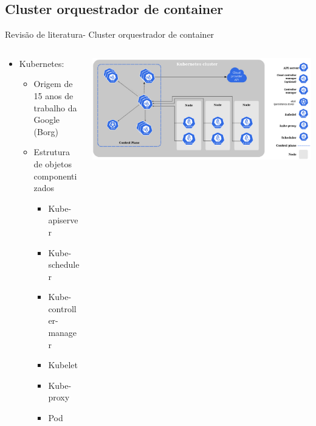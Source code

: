 \documentclass[10pt,brazil]{beamer}
\theoremstyle{definition}
\begin{document}
\subsection{Cluster orquestrador de container}

\begin{frame}{Revisão de literatura- Cluster orquestrador de container}
  \begin{columns}
    \begin{column}{0.5\textwidth}
      \begin{itemize}
        \item Kubernetes\textregistered:
              \begin{itemize}
                \item Origem de 15 anos de trabalho da Google (Borg) %
                \item Estrutura de objetos componentizados %
                      \begin{itemize}
                        \item Kube-apiserver
                        \item Kube-scheduler
                        \item Kube-controller-manager
                        \item Kubelet
                        \item Kube-proxy
                        \item Pod
                      \end{itemize}
              \end{itemize}
      \end{itemize}
    \end{column}
    \begin{column}{0.5\textwidth}  %
      \begin{center}
        \includegraphics[width=1\textwidth]{kubeadm-node.png}
      \end{center}
    \end{column}
  \end{columns}
\end{frame}
\end{document}
